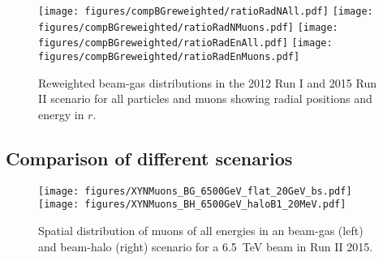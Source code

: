 \begin{figure}%
\centering
\texttt{[image: figures/compBGreweighted/ratioRadNAll.pdf]}
\texttt{[image: figures/compBGreweighted/ratioRadNMuons.pdf]}
\texttt{[image: figures/compBGreweighted/ratioRadEnAll.pdf]}
\texttt{[image: figures/compBGreweighted/ratioRadEnMuons.pdf]}
\caption{Reweighted beam-gas distributions in the 2012 Run I and 2015 Run II scenario for all particles and muons showing radial positions and energy in $r$.
  \label{fig:compBGreweighted2}}
\end{figure}






\subsection{Comparison of different scenarios}



\begin{figure}
  \centering
    \texttt{[image: figures/XYNMuons\_BG\_6500GeV\_flat\_20GeV\_bs.pdf]}
    \texttt{[image: figures/XYNMuons\_BH\_6500GeV\_haloB1\_20MeV.pdf]}
  \caption{Spatial distribution of muons of all energies in an beam-gas (left) and beam-halo (right) scenario for a 6.5~TeV beam in Run II 2015.
    \label{fig:XYNMuons}}
\end{figure}


